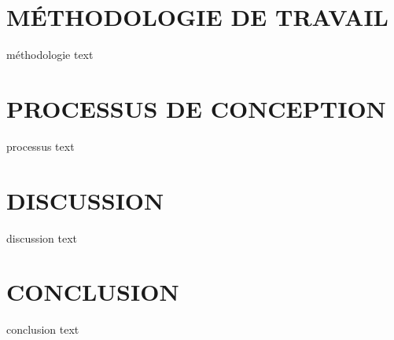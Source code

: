 \documentclass[letterpaper,twoside,12pt,french]{report}
\begin{document}
\chapter*{\uppercase{Méthodologie de travail}}
méthodologie text
\chapter*{\uppercase{Processus de conception}}
processus text
\chapter*{\uppercase{Discussion}}
discussion text
\chapter*{\uppercase{Conclusion}}
conclusion text
\newpage
\begin{spacing}{1}
    \nocite{*}
    

    
\end{spacing}
\end{document}
